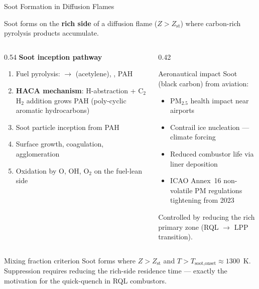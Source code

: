 \documentclass[12pt,aspectratio=169]{beamer}
\newcommand{\Zst}{Z_{\text{st}}}
\begin{document}
\begin{frame}{Soot Formation in Diffusion Flames}

  Soot forms on the \textbf{rich side} of a diffusion flame
  ($Z > \Zst$) where carbon-rich pyrolysis products accumulate.

  \begin{columns}[t]
    \begin{column}{0.54\textwidth}
      \textbf{Soot inception pathway}
      \begin{enumerate}
        \item Fuel pyrolysis:  $\to$ 
              (acetylene), , PAH
        \item \textbf{HACA mechanism}: H-abstraction + C$_2$H$_2$
              addition grows PAH (poly-cyclic aromatic hydrocarbons)
        \item Soot particle inception from PAH
        \item Surface growth, coagulation, agglomeration
        \item Oxidation by O, OH, O$_2$ on the fuel-lean side
      \end{enumerate}
    \end{column}
    \begin{column}{0.42\textwidth}
      \begin{alertblock}{Aeronautical impact}
        Soot (black carbon) from aviation:
        \begin{itemize}
          \item PM$_{2.5}$ health impact near airports
          \item Contrail ice nucleation --- climate forcing
          \item Reduced combustor life via liner deposition
          \item ICAO Annex~16 non-volatile PM regulations
                tightening from 2023
        \end{itemize}
        Controlled by reducing the rich primary zone
        (RQL $\to$ LPP transition).
      \end{alertblock}
    \end{column}
  \end{columns}

  \begin{exampleblock}{Mixing fraction criterion}
    Soot forms where $Z > \Zst$ and $T > T_{\text{soot,onset}}
    \approx 1300$~K.
    Suppression requires reducing the rich-side residence time ---
    exactly the motivation for the quick-quench in RQL combustors.
  \end{exampleblock}
\end{frame}
\end{document}
